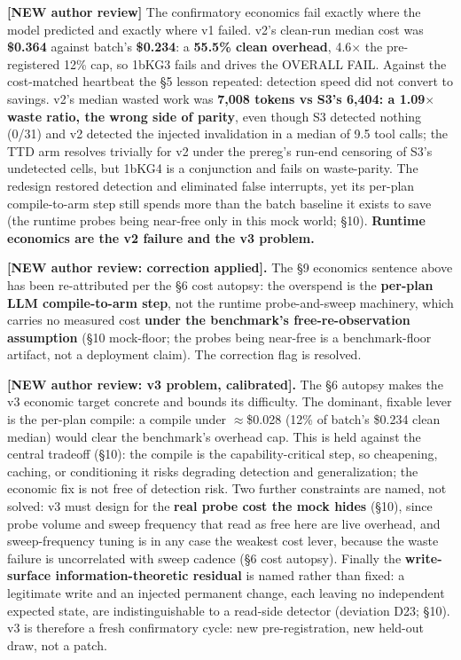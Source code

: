 \documentclass[acmsmall,screen,review,anonymous]{acmart}
\renewenvironment{leftbar}{%
  \def\FrameCommand{\hspace{2pt}{\color{lbcol}\vrule width 1.5pt}\hspace{8pt}}%
  \MakeFramed{\advance\hsize-\width \FrameRestore}\small}%
  {\endMakeFramed}
\begin{document}
\begin{leftbar}
\textbf{[NEW \textperiodcentered{} author review]} The confirmatory economics fail exactly where the model predicted and exactly where v1 failed. v2's clean-run median cost was \textbf{\$0.364} against batch's \textbf{\$0.234}: a \textbf{55.5\% clean overhead}, 4.6$\times$ the pre-registered 12\% cap, so 1bKG3 fails and drives the OVERALL FAIL. Against the cost-matched heartbeat the \S5 lesson repeated: detection speed did not convert to savings. v2's median wasted work was \textbf{7,008 tokens vs S3's 6,404: a 1.09$\times$ waste ratio, the wrong side of parity}, even though S3 detected nothing (0/31) and v2 detected the injected invalidation in a median of 9.5 tool calls; the TTD arm resolves trivially for v2 under the prereg's run-end censoring of S3's undetected cells, but 1bKG4 is a conjunction and fails on waste-parity. The redesign restored detection and eliminated false interrupts, yet its per-plan compile-to-arm step still spends more than the batch baseline it exists to save (the runtime probes being near-free only in this mock world; \S10). \textbf{Runtime economics are the v2 failure and the v3 problem.}

\end{leftbar}
\begin{leftbar}
\textbf{[NEW \textperiodcentered{} author review: correction applied].} The \S9 economics sentence above has been re-attributed per the \S6 cost autopsy: the overspend is the \textbf{per-plan LLM compile-to-arm step}, not the runtime probe-and-sweep machinery, which carries no measured cost \textbf{under the benchmark's free-re-observation assumption} (\S10 mock-floor; the probes being near-free is a benchmark-floor artifact, not a deployment claim). The correction flag is resolved.

\textbf{[NEW \textperiodcentered{} author review: v3 problem, calibrated].} The \S6 autopsy makes the v3 economic target concrete and bounds its difficulty. The dominant, fixable lever is the per-plan compile: a compile under $\approx$\$0.028 (12\% of batch's \$0.234 clean median) would clear the benchmark's overhead cap. This is held against the central tradeoff (\S10): the compile is the capability-critical step, so cheapening, caching, or conditioning it risks degrading detection and generalization; the economic fix is not free of detection risk. Two further constraints are named, not solved: v3 must design for the \textbf{real probe cost the mock hides} (\S10), since probe volume and sweep frequency that read as free here are live overhead, and sweep-frequency tuning is in any case the weakest cost lever, because the waste failure is uncorrelated with sweep cadence (\S6 cost autopsy). Finally the \textbf{write-surface information-theoretic residual} is named rather than fixed: a legitimate write and an injected permanent change, each leaving no independent expected state, are indistinguishable to a read-side detector (deviation D23; \S10). v3 is therefore a fresh confirmatory cycle: new pre-registration, new held-out draw, not a patch.

\end{leftbar}
\end{document}
